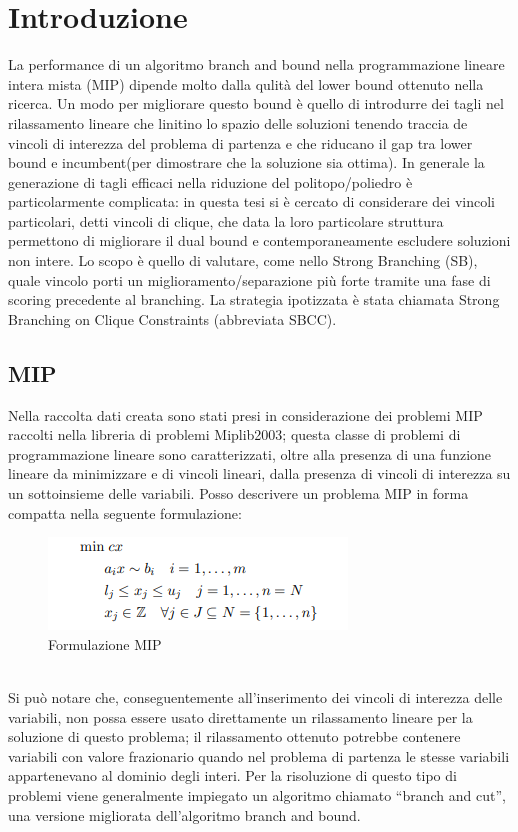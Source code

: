 \documentclass[12pt,a4paper,twoside,openright]{book}
\begin{document}
\mainmatter

\chapter{Introduzione}
La performance di un algoritmo branch and bound nella programmazione lineare intera mista (MIP)
dipende molto dalla qulità del lower bound ottenuto nella ricerca. Un modo per migliorare questo bound
è quello di introdurre dei tagli nel rilassamento lineare che linitino lo spazio delle soluzioni tenendo traccia
de vincoli di interezza del problema di partenza e che riducano il gap tra lower bound e incumbent(per dimostrare che la soluzione sia ottima).
In generale la generazione di tagli efficaci nella riduzione del politopo/poliedro è particolarmente 
complicata: in questa tesi si è cercato di considerare dei vincoli particolari, detti vincoli di clique,
che data la loro particolare struttura permettono di migliorare il dual bound e contemporaneamente escludere 
soluzioni non intere. Lo scopo è quello di valutare, come nello Strong Branching (SB), quale vincolo porti un 
miglioramento/separazione più forte tramite una fase di scoring precedente al branching. La strategia
ipotizzata è stata chiamata Strong Branching on Clique Constraints (abbreviata SBCC).

\section{MIP}
Nella raccolta dati creata sono stati presi in considerazione dei problemi
MIP raccolti nella libreria di problemi Miplib2003; questa classe di problemi
di programmazione lineare sono caratterizzati, oltre alla presenza di una funzione
lineare da minimizzare e di vincoli lineari, dalla presenza di vincoli di interezza
su un sottoinsieme delle variabili. Posso descrivere un problema MIP in forma compatta
nella seguente formulazione: \pagebreak
\begin{figure}[ht]
    \centering
    \includegraphics [scale = 0.7]{mip_scheme.png}
    \caption{ Formulazione MIP }
    \label{fig:mip}
\end{figure}
\\
Si può notare che, conseguentemente all’inserimento dei vincoli di interezza delle variabili,
non possa essere usato direttamente un rilassamento lineare per la soluzione di questo
problema; il rilassamento ottenuto potrebbe contenere variabili con valore frazionario
quando nel problema di partenza le stesse variabili appartenevano al dominio degli interi.
Per la risoluzione di questo tipo di problemi viene generalmente impiegato un algoritmo 
chiamato “branch and cut”, una versione migliorata dell’algoritmo branch and bound.
\end{document}
